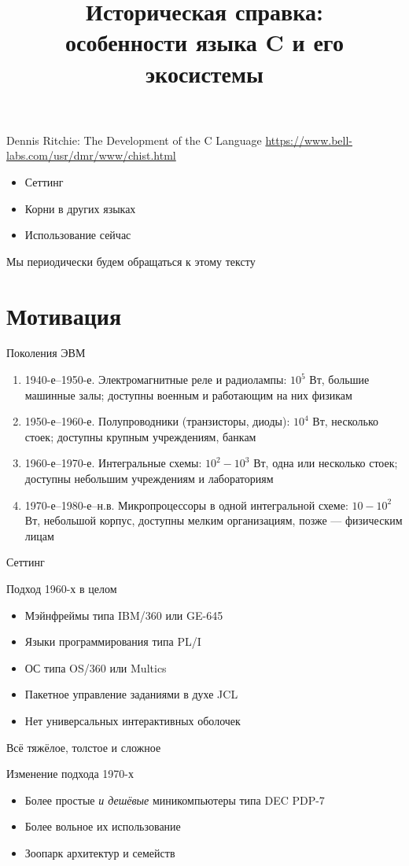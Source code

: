 \documentclass[xetex,aspectratio=169]{beamer}
\title[История C]{Историческая справка:\\особенности языка C и его экосистемы}
\begin{document}
\titleslide

\tocslide

\begin{frame}{Dennis Ritchie: The Development of the C Language}
	\url{https://www.bell-labs.com/usr/dmr/www/chist.html}
	\begin{itemize}
		\item Сеттинг
		\item Корни в других языках
		\item Использование сейчас
	\end{itemize}
	Мы периодически будем обращаться к этому тексту
\end{frame}

\section{Мотивация}

\begin{frame}{Поколения ЭВМ}
	\begin{enumerate}
		\item 1940-е--1950-е. Электромагнитные реле и радиолампы: $10^5$ Вт, большие машинные залы; доступны военным и работающим на них физикам
		\item 1950-е--1960-е. Полупроводники (транзисторы, диоды): $10^4$ Вт, несколько стоек; доступны крупным учреждениям, банкам
		\item 1960-е--1970-е. Интегральные схемы: $10^2-10^3$ Вт, одна или несколько стоек; доступны небольшим учреждениям и лабораториям
		\item 1970-е--1980-е--н.в. Микропроцессоры в одной интегральной схеме: $10-10^2$ Вт, небольшой корпус, доступны мелким организациям, позже --- физическим лицам
	\end{enumerate}
\end{frame}

\begin{frame}{Сеттинг}
	\begin{block}{Подход 1960-х в целом}
		\begin{itemize}
			\item Мэйнфреймы типа IBM/360 или GE-645
			\item Языки программирования типа PL/I
			\item ОС типа OS/360 или Multics
			\item Пакетное управление заданиями в духе JCL
			\item Нет универсальных интерактивных оболочек
		\end{itemize}
		Всё тяжёлое, толстое и сложное
	\end{block}
\pause
	\begin{block}{Изменение подхода 1970-х}
	\begin{itemize}
		\item Более простые \emph{и дешёвые} миникомпьютеры типа DEC PDP-7
		\item Более вольное их использование
		\item Зоопарк архитектур и семейств
	\end{itemize}
\end{block}
\end{frame}
\end{document}
